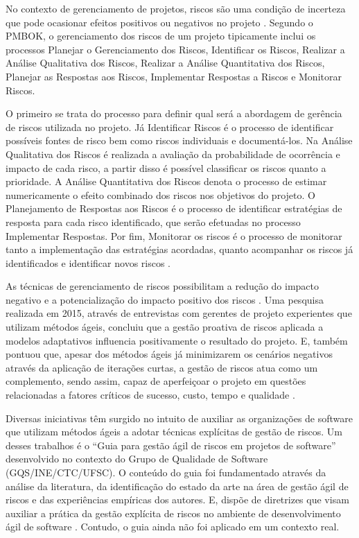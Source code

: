 \documentclass[
    12pt,       %
    openright,      %
    twoside,      %
    a4paper,      %
    english,      %
    french,       %
    spanish,      %
    brazil,       %
    ]{abntex2}
\begin{document}
No contexto de gerenciamento de projetos, riscos são uma condição de incerteza que pode ocasionar efeitos positivos ou negativos no projeto \cite{PMBOK:2017}. Segundo o PMBOK, o gerenciamento dos riscos de um projeto tipicamente inclui os processos Planejar o Gerenciamento dos Riscos, Identificar os Riscos, Realizar a Análise Qualitativa dos Riscos, Realizar a Análise Quantitativa dos Riscos, Planejar as Respostas aos Riscos, Implementar Respostas a Riscos e Monitorar Riscos. 

O primeiro se trata do processo para definir qual será a abordagem de gerência de riscos utilizada no projeto. Já Identificar Riscos é o processo de identificar possíveis fontes de risco bem como riscos individuais e documentá-los. Na Análise Qualitativa dos Riscos é realizada a avaliação da probabilidade de ocorrência e impacto de cada risco, a partir disso é possível classificar os riscos quanto a prioridade. A Análise Quantitativa dos Riscos denota o processo de estimar numericamente o efeito combinado dos riscos nos objetivos do projeto. O Planejamento de Respostas aos Riscos é o processo de identificar estratégias de resposta para cada risco identificado, que serão efetuadas no processo Implementar Respostas. Por fim, Monitorar os riscos é o processo de monitorar tanto a implementação das estratégias acordadas, quanto acompanhar os riscos já identificados e identificar novos riscos \cite{PMBOK:2017}.

As técnicas de gerenciamento de riscos possibilitam a redução do impacto negativo e a potencialização do impacto positivo dos riscos \cite{Milare:2019}. Uma pesquisa realizada em 2015, através de entrevistas com gerentes de projeto experientes que utilizam métodos ágeis, concluiu que a gestão proativa de riscos aplicada a modelos adaptativos influencia positivamente o resultado do projeto. E, também pontuou que, apesar dos métodos ágeis já minimizarem os cenários negativos através da aplicação de iterações curtas, a gestão de riscos atua como um complemento, sendo assim, capaz de aperfeiçoar o projeto em questões relacionadas a fatores críticos de sucesso, custo, tempo e qualidade \cite{Gold:2015}.

Diversas iniciativas têm surgido no intuito de auxiliar as organizações de software que utilizam métodos ágeis a adotar técnicas explícitas de gestão de riscos. Um desses trabalhos é o “Guia para gestão ágil de riscos em projetos de software” desenvolvido no contexto do Grupo de Qualidade de Software (GQS/INE/CTC/UFSC). O conteúdo do guia foi fundamentado através da análise da literatura, da identificação do estado da arte na área de gestão ágil de riscos e das experiências empíricas dos autores. E, dispõe de diretrizes que visam auxiliar a prática da gestão explícita de riscos no ambiente de desenvolvimento ágil de software \cite{Vieira:2020}. Contudo, o guia ainda não foi aplicado em um contexto real.
\end{document}
